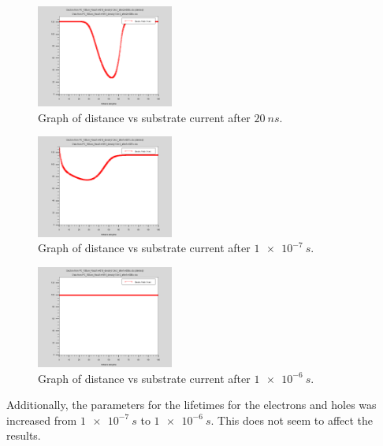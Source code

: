 \documentclass[12pt]{article}
\begin{document}
\begin{figure}[H]
  \centering
  \includegraphics[width=0.4\textwidth]{PC_100um_Nsub1e+015_density1.0e-2_after2e-008s}
  \caption{Graph of distance vs substrate current after $\SI{20}{ns}$.}
  \label{fig:density1.0e-2_after2e-008s}
\end{figure}
\begin{figure}[H]
  \centering
  \includegraphics[width=0.4\textwidth]{PC_100um_Nsub1e+015_density1.0e-2_after1e-007s}
  \caption{Graph of distance vs substrate current after $\SI{1e-7}{s}$.}
  \label{fig:density1.0e-2_after1.0e-1-007s}
\end{figure}
\begin{figure}[H]
  \centering
  \includegraphics[width=0.4\textwidth]{PC_100um_Nsub1e+015_density1.0e-2_after1e-006s}
  \caption{Graph of distance vs substrate current after $\SI{1e-6}{s}$.}
  \label{fig:density1.0e-2_after1e-006s}
\end{figure}

Additionally, the parameters for the lifetimes for the electrons and holes was increased from $\SI{1e-7}{s}$ to $\SI{1e-6}{s}$. This does not seem to affect the results.
\end{document}
